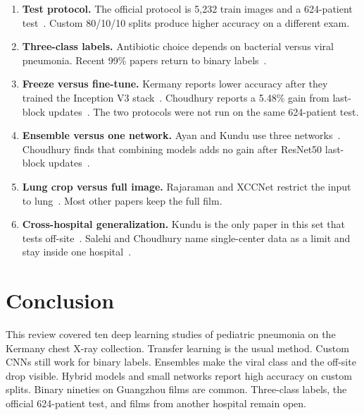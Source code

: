 \documentclass[conference]{IEEEtran}
\begin{document}
\begin{enumerate}
\item \textbf{Test protocol.} The official protocol is 5{,}232 train images and a 624-patient test~\cite{kermany2018}. Custom 80/10/10 splits produce higher accuracy on a different exam.
\item \textbf{Three-class labels.} Antibiotic choice depends on bacterial versus viral pneumonia. Recent 99\% papers return to binary labels~\cite{raghaw2024,chauhan2025,choudhury2026}.
\item \textbf{Freeze versus fine-tune.} Kermany reports lower accuracy after they trained the Inception V3 stack~\cite{kermany2018}. Choudhury reports a 5.48\% gain from last-block updates~\cite{choudhury2026}. The two protocols were not run on the same 624-patient test.
\item \textbf{Ensemble versus one network.} Ayan and Kundu use three networks~\cite{ayan2021,kundu2021}. Choudhury finds that combining models adds no gain after ResNet50 last-block updates~\cite{choudhury2026}.
\item \textbf{Lung crop versus full image.} Rajaraman and XCCNet restrict the input to lung~\cite{rajaraman2018,raghaw2024}. Most other papers keep the full film.
\item \textbf{Cross-hospital generalization.} Kundu is the only paper in this set that tests off-site~\cite{kundu2021}. Salehi and Choudhury name single-center data as a limit and stay inside one hospital~\cite{salehi2021,choudhury2026}.
\end{enumerate}

\section{Conclusion}
\label{sec:conc}
This review covered ten deep learning studies of pediatric pneumonia on the Kermany chest X-ray collection. Transfer learning is the usual method. Custom CNNs still work for binary labels. Ensembles make the viral class and the off-site drop visible. Hybrid models and small networks report high accuracy on custom splits. Binary nineties on Guangzhou films are common. Three-class labels, the official 624-patient test, and films from another hospital remain open.
\end{document}
